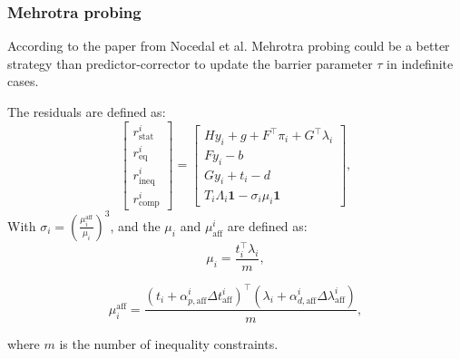 \documentclass[10pt,aspectratio=1610]{beamer} %
\begin{document}
\begin{frame}
    \frametitle{Mehrotra probing}
    According to the paper \cite{nocedalAdaptiveBarrierUpdate2009a} from Nocedal et al.
    Mehrotra probing could be a better strategy than predictor-corrector to update the barrier parameter $\tau$ in indefinite cases.

    \vspace{0.2cm}

    The residuals are defined as:
    \begin{equation}
        \begin{bmatrix}
		r_{\mathrm{stat}}^i \\
		r_{\mathrm{eq}}^i \\
		r_{\mathrm{ineq}}^i \\
		r_{\mathrm{comp}}^i
		\end{bmatrix}
        =
		\begin{bmatrix}
            Hy_i + g + F^\top \pi_i + G^\top \lambda_i \\
            Fy_i - b \\
            Gy_i + t_i - d \\
            T_i \Lambda_i \mathbf{1} - \sigma_i \mu_i \mathbf{1}
        \end{bmatrix}
        ,
\end{equation}
With $\sigma_i = \left( \frac{\mu_i^{\mathrm{aff}}}{\mu_i} \right)^3$, and the $\mu_i$ and $\mu_{\mathrm{aff}}^i$ are defined as:
\begin{equation}
    \mu_i = \frac{t_i^\top \lambda_i}{m},
\end{equation}

\begin{equation}
    \mu_i^{\mathrm{aff}} = \frac{(t_i + \alpha_{p,\mathrm{aff}}^i \Delta t_{\mathrm{aff}}^i)^\top (\lambda_i + \alpha_{d,\mathrm{aff}}^i \Delta \lambda_{\mathrm{aff}}^i)}{m},
\end{equation}

where $m$ is the number of inequality constraints.
\end{frame}
\end{document}
